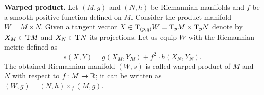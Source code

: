 \begin{description}
\item{\bf Warped product.}
\label{def:Warped product} 
Let $(M,g)$ and $(N,h)$ be Riemannian manifolds 
and $f$ be a smooth positive function defined on $M$.
Consider the product manifold $W=M\times N$.
Given a tangent vector 
$X\z\in \T_{(p,q)} W
=\T_p M\times \T_p N$ denote by 
$X_M\z\in \T M$ and $X_N\z\in \T N$ its projections.
Let us equip $W$ with the Riemannian metric defined as
\[s(X,Y)=g(X_M,Y_M)+f^2\cdot h(X_N,Y_N).\]
The obtained Riemannian manifold $(W,s)$ is called warped product of $M$ and $N$ with respect to $f\colon M\to \mathbb{R}$;
it can be written as  $(W,g)=(N,h)\times_f(M,g)$.

\end{description}
